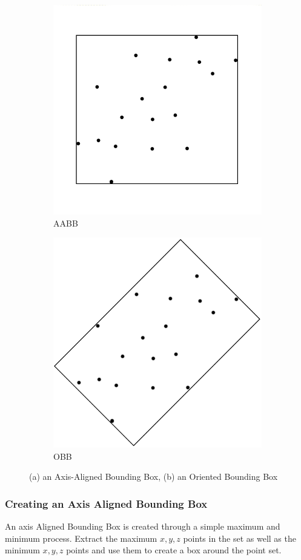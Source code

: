 		\begin{figure}[H]
			\centering
			\begin{subfigure}{.5\textwidth}
				\centering
				\includegraphics[width=0.7\linewidth]{Includes/images/Axis-Aligned}
				\caption{AABB}
				\label{fig:AABB}
			\end{subfigure}%
			\begin{subfigure}{.5\textwidth}
				\centering
				\includegraphics[width=0.7\linewidth]{"Includes/images/Orienrted Bounding box"}
				\caption{OBB}
				\label{fig:OBB}
			\end{subfigure}
			\caption{(a) an Axis-Aligned Bounding Box, (b) an Oriented Bounding Box}
		\end{figure}
		
		\subsubsection{Creating an Axis Aligned Bounding Box}
			An axis Aligned Bounding Box is created through a simple maximum and minimum process.
			Extract the maximum $x,y,z$ points in the set as well as the minimum $x,y,z$ points and use them to create a box around the point set.
		
